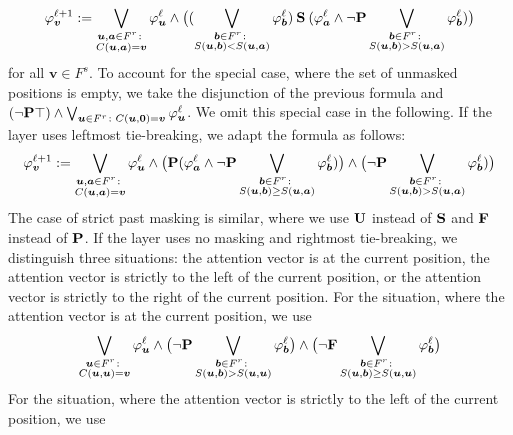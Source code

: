 \[\varphi_{\bm v}^{\ell+1} := \bigvee_{\substack{\bm u,\bm a \in F^r \colon\\ C(\bm u,\bm a) = \bm v}} \varphi_{\bm u}^\ell \wedge
\big((\bigvee_{\substack{\bm b \in F^r \colon\\ S(\bm u,\bm b) < S(\bm u,\bm a)}} \varphi_{\bm b}^\ell) \mathbin{\textbf{S}}
(\varphi_{\bm a}^\ell \wedge \neg\textbf{P} \bigvee_{\substack{\bm b \in F^r \colon\\ S(\bm u,\bm b) > S(\bm u,\bm a)}} 
\varphi_{\bm b}^\ell)\big)\]
for all $\bm v \in F^s$.
To account for the special case, where the set of unmasked positions is empty, we take the disjunction of the previous formula and
$(\neg\textbf{P}\top) \wedge \bigvee_{\bm u \in F^r \colon C(\bm u,\bm 0) = \bm v} \varphi_{\bm u}^\ell$.
We omit this special case in the following.
If the layer uses leftmost tie-breaking, we adapt the formula as follows:
\[\varphi_{\bm v}^{\ell+1} := \bigvee_{\substack{\bm u,\bm a \in F^r \colon\\ C(\bm u,\bm a) = \bm v}} \varphi_{\bm u}^\ell \wedge
\big(\textbf{P} (\varphi_{\bm a}^\ell \wedge \neg\textbf{P} \bigvee_{\substack{\bm b \in F^r \colon\\ S(\bm u,\bm b) \ge S(\bm u,\bm a)}} 
\varphi_{\bm b}^\ell)\big) \wedge
\big(\neg\textbf{P} \bigvee_{\substack{\bm b \in F^r \colon\\ S(\bm u,\bm b) > S(\bm u,\bm a)}} 
\varphi_{\bm b}^\ell)\big)\]
The case of strict past masking is similar, where we use $\mathbin{\textbf{U}}$ instead of $\mathbin{\textbf{S}}$ and $\textbf{F}$ instead of $\textbf{P}$.
If the layer uses no masking and rightmost tie-breaking, we distinguish three situations:
the attention vector is at the current position, the attention vector is strictly to the left of the current position,
or the attention vector is strictly to the right of the current position.
For the situation, where the attention vector is at the current position, we use
\begin{equation}\label{eq:no-masking1}
\bigvee_{\substack{\bm u \in F^r \colon\\ C(\bm u,\bm u) = \bm v}} \varphi_{\bm u}^\ell \wedge
\big(\neg\textbf{P}\bigvee_{\substack{\bm b \in F^r \colon\\ S(\bm u,\bm b) > S(\bm u,\bm u)}} 
\varphi_{\bm b}^\ell\big) \wedge
\big(\neg\textbf{F}\bigvee_{\substack{\bm b \in F^r \colon\\ S(\bm u,\bm b) \ge S(\bm u,\bm u)}} 
\varphi_{\bm b}^\ell\big)
\end{equation}
For the situation, where the attention vector is strictly to the left of the current position, we use
